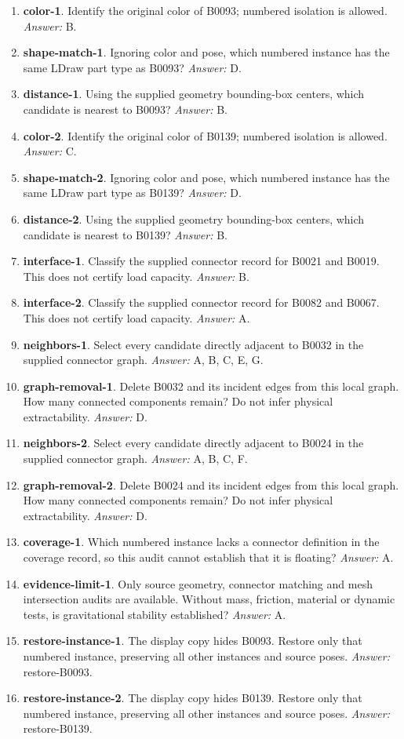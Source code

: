 \begin{enumerate}
\item \textbf{color-1}. Identify the original color of B0093; numbered isolation is allowed. \textit{Answer:} B.
\item \textbf{shape-match-1}. Ignoring color and pose, which numbered instance has the same LDraw part type as B0093? \textit{Answer:} D.
\item \textbf{distance-1}. Using the supplied geometry bounding-box centers, which candidate is nearest to B0093? \textit{Answer:} B.
\item \textbf{color-2}. Identify the original color of B0139; numbered isolation is allowed. \textit{Answer:} C.
\item \textbf{shape-match-2}. Ignoring color and pose, which numbered instance has the same LDraw part type as B0139? \textit{Answer:} D.
\item \textbf{distance-2}. Using the supplied geometry bounding-box centers, which candidate is nearest to B0139? \textit{Answer:} B.
\item \textbf{interface-1}. Classify the supplied connector record for B0021 and B0019. This does not certify load capacity. \textit{Answer:} B.
\item \textbf{interface-2}. Classify the supplied connector record for B0082 and B0067. This does not certify load capacity. \textit{Answer:} A.
\item \textbf{neighbors-1}. Select every candidate directly adjacent to B0032 in the supplied connector graph. \textit{Answer:} A, B, C, E, G.
\item \textbf{graph-removal-1}. Delete B0032 and its incident edges from this local graph. How many connected components remain? Do not infer physical extractability. \textit{Answer:} D.
\item \textbf{neighbors-2}. Select every candidate directly adjacent to B0024 in the supplied connector graph. \textit{Answer:} A, B, C, F.
\item \textbf{graph-removal-2}. Delete B0024 and its incident edges from this local graph. How many connected components remain? Do not infer physical extractability. \textit{Answer:} D.
\item \textbf{coverage-1}. Which numbered instance lacks a connector definition in the coverage record, so this audit cannot establish that it is floating? \textit{Answer:} A.
\item \textbf{evidence-limit-1}. Only source geometry, connector matching and mesh intersection audits are available. Without mass, friction, material or dynamic tests, is gravitational stability established? \textit{Answer:} A.
\item \textbf{restore-instance-1}. The display copy hides B0093. Restore only that numbered instance, preserving all other instances and source poses. \textit{Answer:} restore-B0093.
\item \textbf{restore-instance-2}. The display copy hides B0139. Restore only that numbered instance, preserving all other instances and source poses. \textit{Answer:} restore-B0139.
\end{enumerate}
\clearpage
